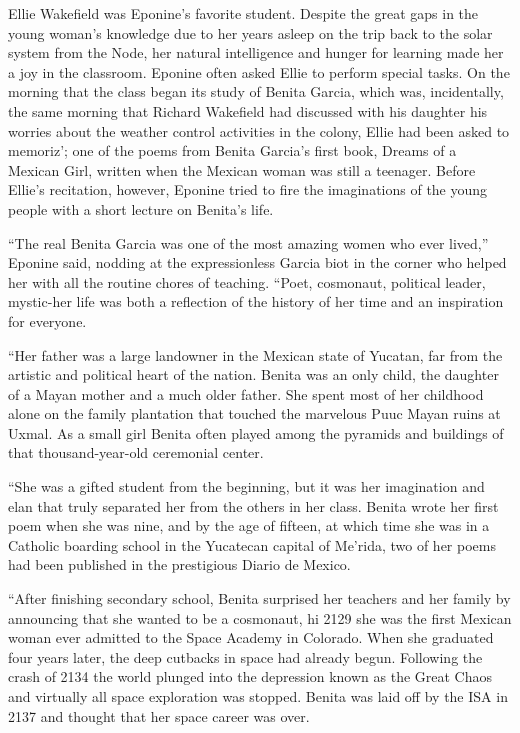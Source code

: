 \documentclass[]{article}
\begin{document}
{Ellie Wakefield was Eponine’s favorite student.  Despite the great gaps in the young woman’s knowledge due to her years asleep on the trip back to the solar system from the Node, her natural intelligence and hunger for learning made her a joy in the classroom.  Eponine often asked Ellie to perform special tasks.  On the morning that the class began its study of Benita Garcia, which was, incidentally, the same morning that Richard Wakefield had discussed with his daughter his worries about the weather control activities in the colony, Ellie had been asked to memoriz’; one of the poems from Benita Garcia’s first book, Dreams of a Mexican Girl, written when the Mexican woman was still a teenager.  Before Ellie’s recitation, however, Eponine tried to fire the imaginations of the young people with a short lecture on Benita’s life.

“The real Benita Garcia was one of the most amazing women who ever lived,” Eponine said, nodding at the expressionless Garcia biot in the corner who helped her with all the routine chores of teaching.  “Poet, cosmonaut, political leader, mystic-her life was both a reflection of the history of her time and an inspiration for everyone.

“Her father was a large landowner in the Mexican state of Yucatan, far from the artistic and political heart of the nation.  Benita was an only child, the daughter of a Mayan mother and a much older father.  She spent most of her childhood alone on the family plantation that touched the marvelous Puuc Mayan ruins at Uxmal.  As a small girl Benita often played among the pyramids and buildings of that thousand-year-old ceremonial center.

“She was a gifted student from the beginning, but it was her imagination and elan that truly separated her from the others in her class.  Benita wrote her first poem when she was nine, and by the age of fifteen, at which time she was in a Catholic boarding school in the Yucatecan capital of Me’rida, two of her poems had been published in the prestigious Diario de Mexico.

“After finishing secondary school, Benita surprised her teachers and her family by announcing that she wanted to be a cosmonaut, hi 2129 she was the first Mexican woman ever admitted to the Space Academy in Colorado.  When she graduated four years later, the deep cutbacks in space had already begun.  Following the crash of 2134 the world plunged into the depression known as the Great Chaos and virtually all space exploration was stopped.  Benita was laid off by the ISA in 2137 and thought that her space career was over.

}
\end{document}
